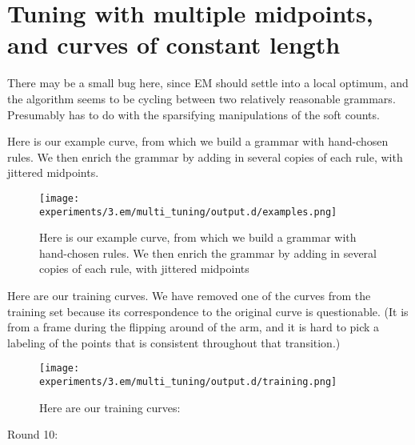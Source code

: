 
\FloatBarrier

\section{Tuning with multiple midpoints, and curves of constant length}

There may be a small bug here, since EM should settle into a local
optimum, and the algorithm seems to be cycling between two relatively
reasonable grammars. Presumably has to do with the sparsifying
manipulations of the soft counts.

Here is our example curve, from which we build a grammar with
hand-chosen rules. We then enrich the grammar by adding in several
copies of each rule, with jittered midpoints.

\begin{figure}
\texttt{[image: experiments/3.em/multi\_tuning/output.d/examples.png]}
\caption{
Here is our example curve, from which we build a grammar
with hand-chosen rules. We then enrich the grammar by adding in
several copies of each rule, with jittered midpoints
}
\end{figure}

Here are our training curves. We have removed one of the curves from
the training set because its correspondence to the original curve is
questionable. (It is from a frame during the flipping around of the
arm, and it is hard to pick a labeling of the points that is
consistent throughout that transition.)

\begin{figure}
\texttt{[image: experiments/3.em/multi\_tuning/output.d/training.png]}
\caption{Here are our training curves:}
\end{figure}

Round 10:



